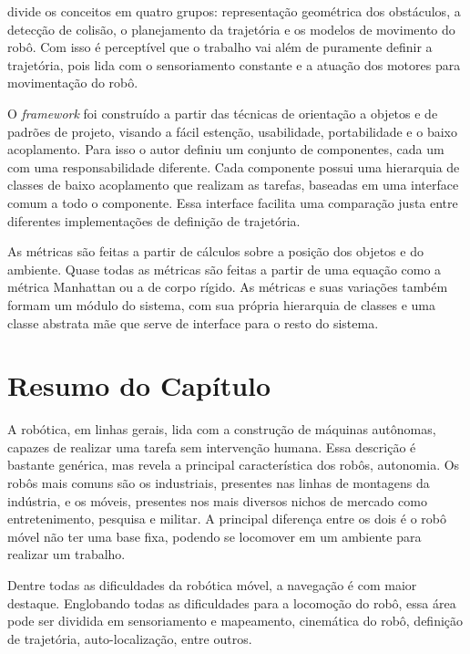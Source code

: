 \cite{Strandberg2004} divide os conceitos em quatro grupos: representação geométrica dos obstáculos, a detecção de colisão, o planejamento da trajetória e os modelos de movimento do robô. Com isso é perceptível que o trabalho vai além de puramente definir a trajetória, pois lida com o sensoriamento constante e a atuação dos motores para movimentação do robô.

O \textit{framework} foi construído a partir das técnicas de orientação a objetos e de padrões de projeto, visando a fácil estenção, usabilidade, portabilidade e o baixo acoplamento. Para isso o autor definiu um conjunto de componentes, cada um com uma responsabilidade diferente. Cada componente possui uma hierarquia de classes de baixo acoplamento que realizam as tarefas, baseadas em uma interface comum a todo o componente. Essa interface facilita uma comparação justa entre diferentes implementações de definição de trajetória.

As métricas são feitas a partir de cálculos sobre a posição dos objetos e do ambiente. Quase todas as métricas são feitas a partir de uma equação como a métrica Manhattan ou a de corpo rígido. As métricas e suas variações também formam um módulo do sistema, com sua própria hierarquia de classes e uma classe abstrata mãe que serve de interface para o resto do sistema.

\section{Resumo do Capítulo}

A robótica, em linhas gerais, lida com a construção de máquinas autônomas, capazes de realizar uma tarefa sem intervenção humana. Essa descrição é bastante genérica, mas revela a principal característica dos robôs, autonomia. Os robôs mais comuns são os industriais, presentes nas linhas de montagens da indústria, e os móveis, presentes nos mais diversos nichos de mercado como entretenimento, pesquisa e militar. A principal diferença entre os dois é o robô móvel não ter uma base fixa, podendo se locomover em um ambiente para realizar um trabalho.

Dentre todas as dificuldades da robótica móvel, a navegação é com maior destaque. Englobando todas as dificuldades para a locomoção do robô, essa área pode ser dividida em sensoriamento e mapeamento, cinemática do robô, definição de trajetória, auto-localização, entre outros.


